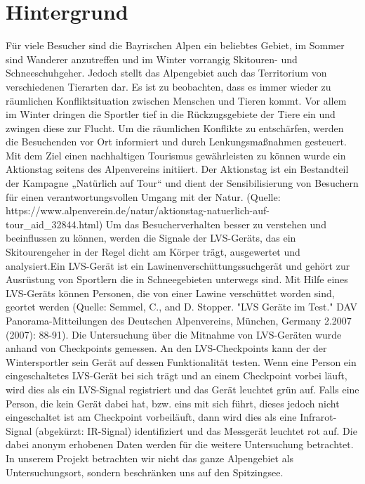 \chapter{Hintergrund}

Für viele Besucher sind die Bayrischen Alpen ein beliebtes Gebiet, im Sommer sind Wanderer anzutreffen und im Winter vorrangig Skitouren- und Schneeschuhgeher. Jedoch stellt das Alpengebiet auch das Territorium von verschiedenen Tierarten dar. Es ist zu beobachten, dass es immer wieder zu räumlichen Konfliktsituation zwischen Menschen und Tieren kommt. Vor allem im Winter dringen die Sportler tief in die Rückzugsgebiete der Tiere ein und zwingen diese zur Flucht. Um die räumlichen Konflikte zu entschärfen, werden die Besuchenden vor Ort informiert und durch Lenkungsmaßnahmen gesteuert. Mit dem Ziel einen nachhaltigen Tourismus gewährleisten zu können wurde ein Aktionstag seitens des Alpenvereins initiiert. Der Aktionstag ist ein Bestandteil der Kampagne „Natürlich auf Tour“ und dient der Sensibilisierung von Besuchern für einen verantwortungsvollen Umgang mit der Natur. (Quelle: https://www.alpenverein.de/natur/aktionstag-natuerlich-auf-tour_aid_32844.html)
   Um das Besucherverhalten besser zu verstehen und beeinflussen zu können, werden die Signale der LVS-Geräts, das ein Skitourengeher in der Regel dicht am Körper trägt, ausgewertet und analysiert.Ein LVS-Gerät ist ein Lawinenverschüttungssuchgerät und gehört zur Ausrüstung von Sportlern die in Schneegebieten unterwegs sind. Mit Hilfe eines LVS-Geräts können Personen, die von einer Lawine verschüttet worden sind, geortet werden (Quelle: Semmel, C., and D. Stopper. "LVS Geräte im Test." DAV Panorama-Mitteilungen des Deutschen Alpenvereins, München, Germany 2.2007 (2007): 88-91). Die Untersuchung über die Mitnahme von LVS-Geräten wurde anhand von Checkpoints gemessen. An den LVS-Checkpoints kann der der Wintersportler sein Gerät auf dessen Funktionalität testen. Wenn eine Person ein eingeschaltetes LVS-Gerät bei sich trägt und an einem Checkpoint vorbei läuft, wird dies als ein LVS-Signal registriert und das Gerät leuchtet grün auf. Falls eine Person, die kein Gerät dabei hat, bzw. eins mit sich führt, dieses jedoch nicht eingeschaltet ist am Checkpoint vorbeiläuft, dann wird dies als eine Infrarot-Signal (abgekürzt: IR-Signal) identifiziert und das Messgerät leuchtet rot auf. Die dabei anonym erhobenen Daten werden für die weitere Untersuchung betrachtet. 
   In unserem Projekt betrachten wir nicht das ganze Alpengebiet als Untersuchungsort, sondern beschränken uns auf den Spitzingsee. 
